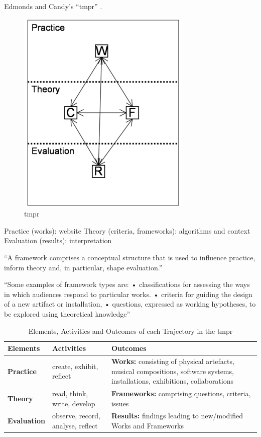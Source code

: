 Edmonds and Candy's ``\gls{tmpr}'' \autocite{Edmonds2010}.

\begin{figure}[htb] %
  \centering
  \includegraphics{images/tmpr}
  \caption[tmpr]{tmpr}
\label{fig:tmpr}
\end{figure}

Practice (works): website
Theory (criteria, frameworks): algorithms and context
Evaluation (results): interpretation


``A framework comprises a conceptual structure that is used to influence practice, inform theory and, in particular, shape evaluation.''

``Some examples of framework types are:
• classifications for assessing the ways in which audiences respond to particular works.
• criteria for guiding the design of a new artifact or installation,
• questions, expressed as working hypotheses, to be explored using theoretical knowledge''

\begin{table}[htb]
  \begin{tabu}{X[1]X[2]X[3]}
  \toprule
  \textbf{Elements}
  &
  \textbf{Activities}
  &
  \textbf{Outcomes}
  \\ \midrule
  \textbf{Practice}
  &
  create, exhibit, reflect
  &
  \textbf{Works:} consisting of physical artefacts, musical compositions, software systems, installations, exhibitions, collaborations
  \\ \midrule
  \textbf{Theory}
  &
  read, think, write, develop
  &
  \textbf{Frameworks:} comprising questions, criteria, issues
  \\ \midrule
  \textbf{Evaluation}
  &
  observe, record, analyse, reflect
  &
  \textbf{Results:} findings leading to new/modified Works and Frameworks
  \\ \bottomrule
  \end{tabu}
\caption[Elements, Activities and Outcomes of the \gls{tmpr}]{Elements, Activities and Outcomes of each Trajectory in the \gls{tmpr}}
\label{tmprtable}
\end{table}

